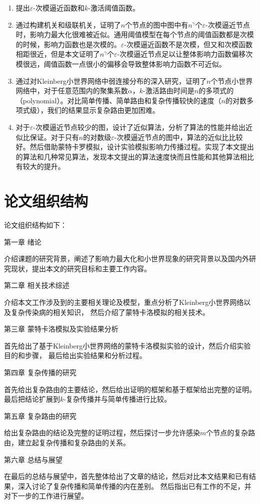 \begin{enumerate}
\item  提出$\varepsilon$-次模逼近函数和$k$-激活阈值函数。
\item  通过构建机关和级联机关，证明了$n$个节点的图中图中有$n^{\gamma}$个$\varepsilon$-次模逼近节点时，影响力最大化很难被近似。通用阈值模型在每个节点的阈值函数都是次模的时候，影响力函数也是次模的\cite{Mossel2007sub}。$\varepsilon$-次模逼近函数不是次模，但又和次模函数相距很近，但是本文证明了$n^{\gamma}$个$\varepsilon$-次模逼近节点足以让整体影响力函数偏移次模很远，阈值函数一点很小的偏移会导致整体影响力函数不可近似。
\item  通过对Kleinberg小世界网络中弱连接分布的深入研究，证明了$n$个节点小世界网络中，对于任意范围内的聚集系数$\alpha$，$k$-激活路由时间是$n$的多项式的（polynomial）。对比简单传播、简单路由和复杂传播较快的速度（$n$的对数多项式级），我们的结果显示复杂路由更加困难。
\item  对于$\varepsilon$-次模逼近节点较少的图，设计了近似算法，分析了算法的性能并给出近似比保证。对于只有$n$的对数级$\varepsilon$-次模逼近节点的图中，算法的近似比比较好。然后借助蒙特卡罗模拟，设计实验模拟影响力传播过程。实现了本文提出的算法和几种常见算法，发现本文提出的算法速度快而且性能和其他算法相比有较大的提升。
\end{enumerate}

\section{论文组织结构}
论文组织结构如下：

第一章 绪论

介绍课题的研究背景，阐述了影响力最大化和小世界现象的研究背景以及国内外研究现状，提出本文的研究目标和主要工作内容。

第二章 相关技术综述

介绍本文工作涉及到的主要相关理论及模型，重点分析了Kleinberg小世界网络以及复杂传染病的相关知识，
然后介绍了蒙特卡洛模拟的相关技术。

第三章 蒙特卡洛模拟及实验结果分析

首先给出了基于Kleinberg小世界网络的蒙特卡洛模拟实验的设计，然后介绍实验目的和步骤，
最后给出实验结果和分析过程。

第四章 复杂传播的研究

首先给出复杂路由的主要结论，然后给出证明的框架和基于框架给出完整的证明。
最后把结论扩展到$k$-复杂传播并与简单传播进行比较。


第五章 复杂路由的研究

给出复杂路由的结论及完整的证明过程，然后探讨一步允许感染$m$个节点的复杂路由，建立起复杂传播和复杂路由的关系。

第六章 总结与展望

在最后的总结与展望中，首先整体给出了文章的结论，然后对比本文结果和已有结果，深入讨论了复杂传播和简单传播的内在差别。
然后指出已有工作的不足，并对下一步的工作进行展望。